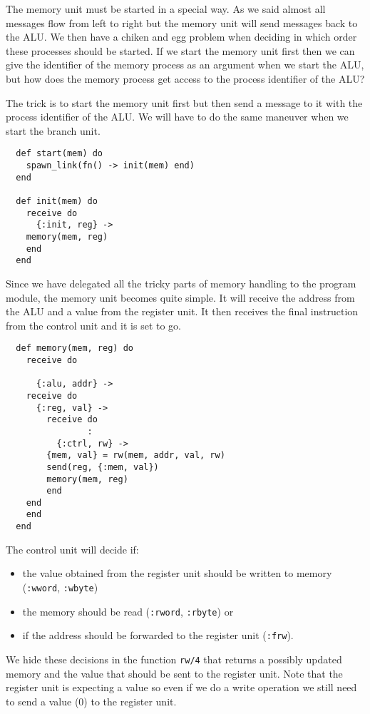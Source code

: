 \documentclass[a4paper,11pt]{article}
\begin{document}
The memory unit must be started in a special way. As we said almost
all messages flow from left to right but the memory unit will send
messages back to the ALU. We then have a chiken and egg problem when
deciding in which order these processes should be started. If we start
the memory unit first then we can give the identifier of the memory
process as an argument when we start the ALU, but how does the memory
process get access to the process identifier of the ALU?

The trick is to start the memory unit first but then send a message
to it with the process identifier of the ALU. We will have to do the
same maneuver when we start the branch unit.

\begin{verbatim}
  def start(mem) do
    spawn_link(fn() -> init(mem) end)
  end

  def init(mem) do
    receive do
      {:init, reg} ->
	memory(mem, reg)
    end
  end
\end{verbatim}

Since we have delegated all the tricky parts of memory handling to the
program module, the memory unit becomes quite simple. It will receive
the address from the ALU and a value from the register unit. It then
receives the final instruction from the control unit and it is set to go.

\begin{verbatim}
  def memory(mem, reg) do
    receive do

      {:alu, addr} ->
	receive do
	  {:reg, val} ->
	    receive do
                :
	      {:ctrl, rw} ->
		{mem, val} = rw(mem, addr, val, rw)
		send(reg, {:mem, val})
		memory(mem, reg)
	    end
	end
    end
  end
\end{verbatim}

The control unit will decide if:

\begin{itemize}
\item the value obtained from the register unit should be written to memory ({\tt :wword}, {\tt :wbyte})
  
\item the memory should be read ({\tt :rword}, {\tt :rbyte}) or
  
\item if the address should be forwarded to the register unit ({\tt :frw}).

\end{itemize}

We hide these decisions in the function {\tt rw/4} that returns a
possibly updated memory and the value that should be sent to the
register unit. Note that the register unit is expecting a value so
even if we do a write operation we still need to send a value (0) to
the register unit.
\end{document}
